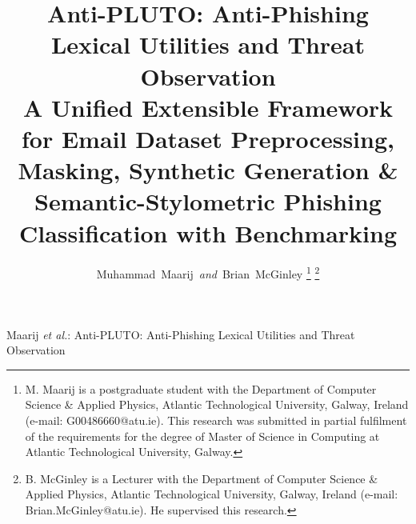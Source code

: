 \documentclass[journal]{IEEEtran}
\begin{document}
\title{Anti-PLUTO: Anti-Phishing Lexical Utilities and Threat Observation\\
\large A Unified Extensible Framework for Email Dataset Preprocessing, Masking, Synthetic Generation \& Semantic-Stylometric Phishing Classification with Benchmarking}

\author{Muhammad~Maarij~\textit{and}~Brian~McGinley%
\thanks{M. Maarij is a postgraduate student with the Department of Computer Science \& Applied Physics, Atlantic Technological University, Galway, Ireland (e-mail: G00486660@atu.ie). This research was submitted in partial fulfilment of the requirements for the degree of Master of Science in Computing at Atlantic Technological University, Galway.}%
\thanks{B. McGinley is a Lecturer with the Department of Computer Science \& Applied Physics, Atlantic Technological University, Galway, Ireland (e-mail: Brian.McGinley@atu.ie). He supervised this research.}%
}

%
{Maarij \textit{et al.}: Anti-PLUTO: Anti-Phishing Lexical Utilities and Threat Observation}

\maketitle
\end{document}

